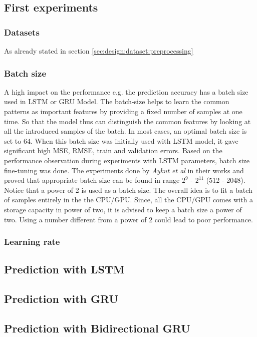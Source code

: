 \subsection{First experiments}
\label{sec:eval:experiments:early}

\subsubsection{Datasets}
\label{sec:eval:experiments:early:ds}
As already stated in section \ref{sec:design:dataset:preprocessing}

\subsubsection{Batch size}
\label{sec:eval:experiments:early:batch}
A high impact on the performance e.g. the prediction accuracy has a batch size used in LSTM or GRU Model. The batch-size helps to learn the common patterns as important features by providing a fixed number of samples at one time. So that the model thus can distinguish the common features by looking at all the introduced samples of the batch. In most cases, an optimal batch size is set to 64. When this batch size was initially used with LSTM model, it gave significant high MSE, RMSE, train and validation errors. Based on the performance observation during experiments with LSTM parameters, batch size fine-tuning was done. The experiments done by \textit{Aykut et al} in their works \cite{delay_compensation_360} and \cite{telepresence} proved that appropriate batch size can be found in range $2^{9}$ - $2^{11}$ (512 - 2048). Notice that a power of 2 is used as a batch size. The overall idea is to fit a batch of samples entirely in the the CPU/GPU. Since, all the CPU/GPU comes with a storage capacity in power of two, it is advised to keep a batch size a power of two. Using a number different from a power of 2 could lead to poor performance.

\subsubsection{Learning rate}
\label{sec:eval:experiments:early:lr}

\subsection{Prediction with LSTM}
\label{sec:eval:experiments:lstm}

\subsection{Prediction with GRU}
\label{sec:eval:experiments:gru}

\subsection{Prediction with Bidirectional GRU}
\label{sec:eval:experiments:bi-gru}